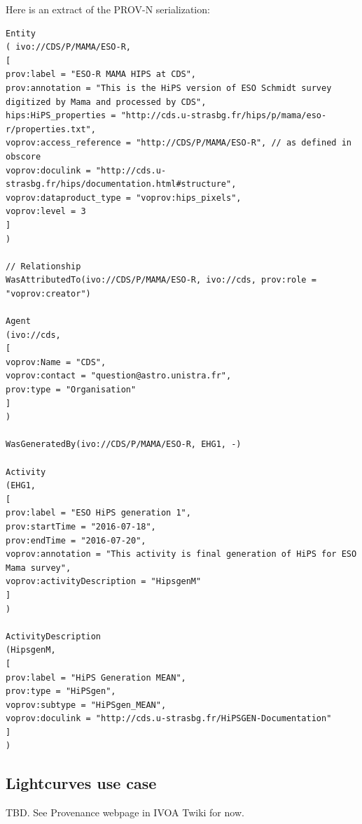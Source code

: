 Here is an extract of the PROV-N serialization:

\begin{verbatim}
Entity
( ivo://CDS/P/MAMA/ESO-R, 
[
prov:label = "ESO-R MAMA HIPS at CDS",
prov:annotation = "This is the HiPS version of ESO Schmidt survey digitized by Mama and processed by CDS",
hips:HiPS_properties = "http://cds.u-strasbg.fr/hips/p/mama/eso-r/properties.txt",
voprov:access_reference = "http://CDS/P/MAMA/ESO-R", // as defined in obscore 
voprov:doculink = "http://cds.u-strasbg.fr/hips/documentation.html#structure",
voprov:dataproduct_type = "voprov:hips_pixels",
voprov:level = 3
]
)

// Relationship
WasAttributedTo(ivo://CDS/P/MAMA/ESO-R, ivo://cds, prov:role = "voprov:creator")

Agent
(ivo://cds,
[
voprov:Name = "CDS",
voprov:contact = "question@astro.unistra.fr",
prov:type = "Organisation"
]
) 

WasGeneratedBy(ivo://CDS/P/MAMA/ESO-R, EHG1, -)

Activity
(EHG1,
[
prov:label = "ESO HiPS generation 1",
prov:startTime = "2016-07-18",
prov:endTime = "2016-07-20",
voprov:annotation = "This activity is final generation of HiPS for ESO Mama survey",
voprov:activityDescription = "HipsgenM"
]
)

ActivityDescription 
(HipsgenM,
[
prov:label = "HiPS Generation MEAN",
prov:type = "HiPSgen",
voprov:subtype = "HiPSgen_MEAN",
voprov:doculink = "http://cds.u-strasbg.fr/HiPSGEN-Documentation"
]
)
\end{verbatim}


\subsection{Lightcurves use case}
TBD. See Provenance webpage in IVOA Twiki for now.
